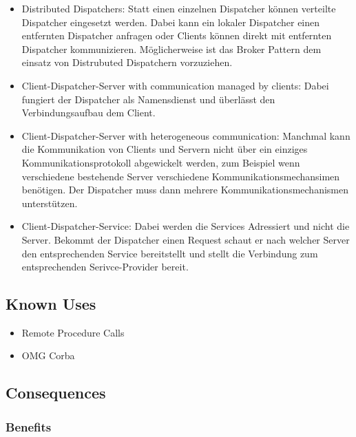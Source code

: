 \begin{itemize}
	\item Distributed Dispatchers: Statt einen einzelnen Dispatcher können verteilte Dispatcher eingesetzt werden. Dabei kann ein lokaler Dispatcher einen entfernten Dispatcher anfragen oder Clients können direkt mit entfernten Dispatcher kommunizieren. Möglicherweise ist das Broker Pattern dem einsatz von Distrubuted Dispatchern vorzuziehen.
	\item Client-Dispatcher-Server with communication managed by clients: Dabei fungiert der Dispatcher als Namensdienst und überlässt den Verbindungsaufbau dem Client.
	\item Client-Dispatcher-Server with heterogeneous communication: Manchmal kann die Kommunikation von Clients und Servern nicht über ein einziges Kommunikationsprotokoll abgewickelt werden, zum Beispiel wenn verschiedene bestehende Server verschiedene Kommunikationsmechansimen benötigen. Der Dispatcher muss dann mehrere Kommunikationsmechanismen unterstützen.
	\item Client-Dispatcher-Service: Dabei werden die Services Adressiert und nicht die Server. Bekommt der Dispatcher einen Request schaut er nach welcher Server den entsprechenden Service bereitstellt und stellt die Verbindung zum entsprechenden Serivce-Provider bereit.
\end{itemize}

\subsection*{Known Uses}


\begin{itemize}
	\item Remote Procedure Calls
	\item OMG Corba
\end{itemize}

\subsection*{Consequences}


\subsubsection*{Benefits}



